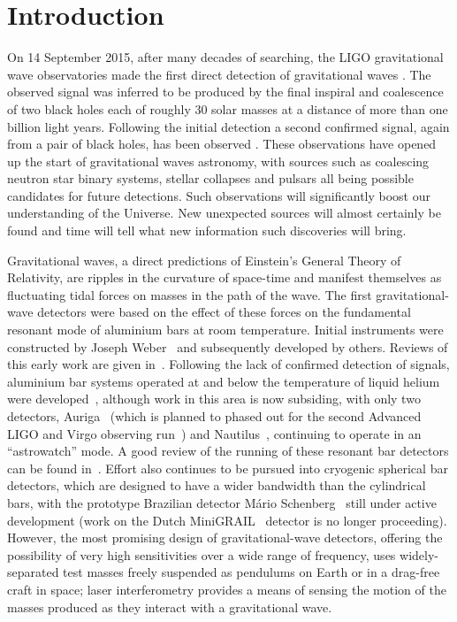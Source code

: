 \section{Introduction}
\label{section:introduction} 


On 14 September 2015, after many decades of searching, the LIGO gravitational wave
observatories made the first direct detection of gravitational waves \cite{GW150914}.
The observed signal was inferred to be produced by the final inspiral and coalescence
of two black holes each of roughly 30 solar masses at a distance of more than one billion
light years. Following the initial detection a second confirmed signal, again from a pair
of black holes, has been observed \cite{GW151226}. These observations have opened up the start of
gravitational waves astronomy, with sources such as coalescing neutron star binary
systems, stellar collapses and pulsars all being possible candidates for future detections.
Such observations will significantly boost our understanding of the
Universe. New unexpected sources will almost certainly be found and time will
tell what new information such discoveries will bring.

Gravitational waves, a direct predictions of Einstein's General
Theory of Relativity, are ripples in the curvature of space-time and manifest themselves as fluctuating
tidal forces on masses in the path of the wave. The first gravitational-wave
detectors were based on the effect of these forces on the fundamental resonant
mode of aluminium bars at room temperature. Initial instruments were constructed
by Joseph Weber~\cite{Weber1, Weber2} and subsequently developed by others.
Reviews of this early work are given in~\cite{Tyson, Douglass}. Following the
lack of confirmed detection of signals, aluminium bar systems operated at and
below the temperature of liquid helium were developed~\cite{Astone, Prodi,
Amaldi, Heng}, although work in this area is now subsiding, with only two
detectors, Auriga~\cite{AURIGA} (which is planned to phased out for the second
Advanced LIGO and Virgo observing run~\cite{Pizzella2016}) and Nautilus~\cite{NAUTILUS}, continuing to
operate in an ``astrowatch'' mode. A good review of the running of these resonant bar detectors can be found in~\cite{Pizzella2016}. Effort also continues to be pursued into cryogenic spherical bar
detectors, which are designed to have a wider bandwidth than the cylindrical
bars, with the prototype Brazilian detector M\'{a}rio Schenberg~\cite{Schenberg, Aguiar:2006} still under active development (work on the
Dutch MiniGRAIL~\cite{MiniGRAIL, Gottardi:2007} detector is no longer proceeding).
However, the most promising design of gravitational-wave detectors, offering the
possibility of very high sensitivities over a wide range of frequency, uses
widely-separated test masses freely suspended as pendulums on Earth or
in a drag-free craft in space; laser interferometry provides a means
of sensing the motion of the masses produced as they interact with a
gravitational wave.


